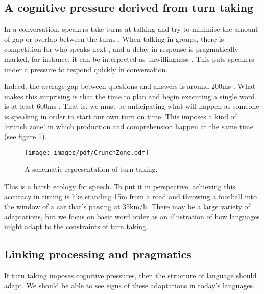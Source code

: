 \documentclass[12pt]{article}
\begin{document}
\subsection{A cognitive pressure derived from turn taking}

In a conversation, speakers take turns at talking and try to minimise the amount of gap or overlap between the turns \citep{sacks1974simplest}.  When talking in groups, there is competition for who speaks next \citep{levinson1983pragmatics}, and a delay in response is pragmatically marked, for instance, it can be interpreted as unwillingness \citep{Kendrick_Torreira_2015}.  This puts speakers under a pressure to respond quickly in conversation.  

Indeed, the average gap between questions and answers is around 200ms \citep{stivers2009universals}.  What makes this surprising is that the time to plan and begin executing a single word is at least 600ms \citep{indefrey2011spatial}.  That is, we must be anticipating what will happen as someone is speaking in order to start our own turn on time.  This imposes a kind of `crunch zone' in which production and comprehension happen at the same time (see figure \ref{fig:crunchZone}).

\begin{figure}[htbp]
\begin{center}
\texttt{[image: images/pdf/CrunchZone.pdf]}
\caption{A schematic representation of turn taking.}
\label{fig:crunchZone}
\end{center}
\end{figure}

This is a harsh ecology for speech.  To put it in perspective, achieving this accuracy in timing is like standing 15m from a road and throwing a football into the window of a car that's passing at 35km/h.  There may be a large variety of adaptations, but we focus on basic word order as an illustration of how languages might adapt to the constraints of turn taking. 






\subsection{Linking processing and pragmatics}

If turn taking imposes cognitive pressures, then the structure of language should adapt. We should be able to see signs of these adaptations in today's languages.
\end{document}

